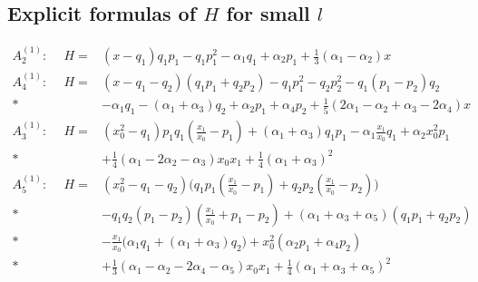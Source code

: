 \subsection{Explicit formulas of $H$ for small $l$}
\allowdisplaybreaks
\begin{eqnarray*}
A^{(1)}_2:\ \ & H=&(x-q_1)q_1p_1-q_1 p_1^2-\alpha_1 q_1+\alpha_2 p_1
+\frac{1}{3}(\alpha_1-\alpha_2) x\\
A^{(1)}_4:\ \ & H=&(x-q_1-q_2)(q_1p_1+q_2p_2)
-q_1 p_1^2-q_2 p_2^2 -q_1(p_1-p_2)q_2 \\*
&&-\alpha_1q_1-(\alpha_1+\alpha_3)q_2+\alpha_2p_1+\alpha_4 p_2+
\frac{1}{5}(2\alpha_1-\alpha_2+\alpha_3-2\alpha_4) x\\
A^{(1)}_3:\ \ 
& H=&  (x_0^2-q_1)p_1q_1(\frac{x_1}{x_0}-p_1)
+(\alpha_1+\alpha_3)q_1p_1 -\alpha_1 \frac{x_1}{x_0}q_1
+\alpha_2 x_0^2p_1
\\*
&&
+\frac{1}{4}(\alpha_1-2\alpha_2-\alpha_3) x_0 x_1
+\frac{1}{4}(\alpha_1+\alpha_3)^2\\
A^{(1)}_5:\ \
& H=&
(x_0^2-q_1-q_2)\big(q_1p_1(\frac{x_1}{x_0}-p_1)+q_2p_2(\frac{x_1}{x_0}-p_2)\big)\\*
&&
-q_1q_2(p_1-p_2)(\frac{x_1}{x_0}+p_1-p_2)
+(\alpha_1+\alpha_3+\alpha_5)(q_1p_1+q_2 p_2)\\*
&&
-\frac{x_1}{x_0}\big(\alpha_1  q_1+(\alpha_1+\alpha_3)q_2\big)
+x_0^2(\alpha_2 p_1+\alpha_4 p_2)\\*
&&
+\frac{1}{3}(\alpha_1-\alpha_2-2\alpha_4-\alpha_5) x_0 x_1 
+\frac{1}{4}(\alpha_1+\alpha_3+\alpha_5)^2
\end{eqnarray*}

